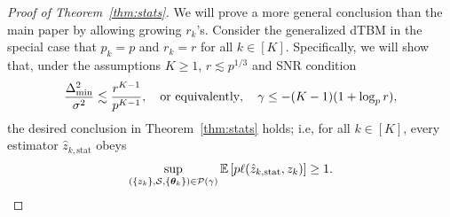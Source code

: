 \documentclass[lettersize,onecolumn,journal]{IEEEtran}
\theoremstyle{definition}
\theoremstyle{definition}
\begin{document}
\begin{proof}[Proof of Theorem~\ref{thm:stats}]
We will prove a more general conclusion than the main paper by allowing growing $r_k$'s. Consider the generalized dTBM in the special case that $p_k = p$ and $r_k = r$ for all $ k\in [K]$. Specifically, we will show that, under 
the assumptions $K\geq 1$, $r\lesssim p^{1/3}$ and SNR condition
\[
{\Delta^2_{\min}\over \sigma^2}\lesssim {r^{K-1}\over p^{K-1}},\quad \text{or equivalently}, \quad \gamma\leq -(K-1)(1+\log_p r),
\]
 the desired conclusion in Theorem~\ref{thm:stats} holds; i.e, for all $k \in [K]$, every estimator $\hat z_{k,\text{stat}}$ obeys
\begin{equation}\label{eq:max}
    \sup_{(\{z_k\}, \tS, \{\mtheta_k\}) \in \tP(\gamma)} \bbE \left[ p\ell(\hat z_{k,\text{stat}}, z_k) \right]\geq 1.
\end{equation}


\end{proof}
\end{document}
